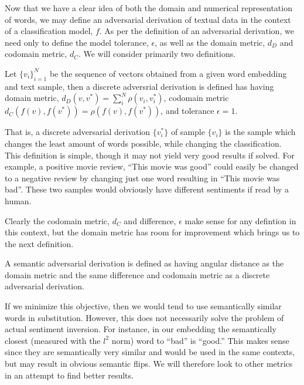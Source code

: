 \noindent
Now that we have a clear idea of both the domain and numerical representation of words, we may define an adversarial derivation of textual data in the context of a classification model, $f$.  As per the definition of an adversarial derivation, we need only to define the model tolerance, $\epsilon$, as well as the domain metric, $d_D$ and codomain metric, $d_C$.  We will consider primarily two definitions.

\begin{definition}
Let $\{v_i\}_{i=1}^N$ be the sequence of vectors obtained from a given word embedding and text sample, then a discrete adversrial derivation is defined has having domain metric, $d_D(v,v^*) = \sum_i^N\rho(v_i,v_i^*)$, codomain metric $d_C(f(v),f(v^*)) = \rho(f(v),f(v^*))$, and tolerance $\epsilon = 1$.
\end{definition}

That is, a discrete adversarial derivation $\{v_i^*\}$ of sample $\{v_i\}$ is the sample which changes the least amount of words possible, while changing the classification.  This definition is simple, though it may not yield very good results if solved.  For example, a positive movie review, ``This movie was good'' could easily be changed to a negative review by changing just one word resulting in ``This movie was bad''.  These two samples would obviously have different sentiments if read by a human.

Clearly the codomain metric, $d_C$ and difference, $\epsilon$ make sense for any defintion in this context, but the domain metric has room for improvement which brings us to the next definition.

\begin{definition}
A semantic adversarial derivation is defined as having angular distance as the domain metric and the same difference and codomain metric as a discrete adversarial derivation.
\end{definition}

If we minimize this objective, then we would tend to use semantically similar words in substitution.  However, this does not necessarily solve the problem of actual sentiment inversion.  For instance, in our embedding the semantically closest (measured with the $l^2$ norm) word to ``bad'' is ``good.''  This makes sense since they are semantically very similar and would be used in the same contexts, but may result in obvious semantic flips.  We will therefore look to other metrics in an attempt to find better results.

